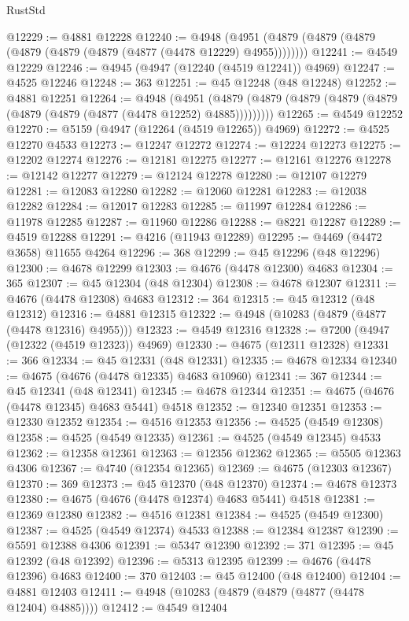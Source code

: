 \begin{lexlean}{RustStd}
\begin{coremodule}
{\begin{coremodule}
{{{{{{{{{{{{{{{{{{{{{{{{{{{{{{{{{{{{{{{{{{{{{{{{{{{{{{{{{{{{@12229 := @4881 @12228
@12240 := @4948 (@4951 (@4879 (@4879 (@4879 (@4879 (@4879 (@4879 (@4877 (@4478 @12229) @4955))))))))
@12241 := @4549 @12229
@12246 := @4945 (@4947 (@12240 (@4519 @12241)) @4969)
@12247 := @4525 @12246
@12248 := 363
@12251 := @45 @12248 (@48 @12248)
@12252 := @4881 @12251
@12264 := @4948
    (@4951 (@4879 (@4879 (@4879 (@4879 (@4879 (@4879 (@4879 (@4877 (@4478 @12252) @4885)))))))))
@12265 := @4549 @12252
@12270 := @5159 (@4947 (@12264 (@4519 @12265)) @4969)
@12272 := @4525 @12270 @4533
@12273 := @12247 @12272
@12274 := @12224 @12273
@12275 := @12202 @12274
@12276 := @12181 @12275
@12277 := @12161 @12276
@12278 := @12142 @12277
@12279 := @12124 @12278
@12280 := @12107 @12279
@12281 := @12083 @12280
@12282 := @12060 @12281
@12283 := @12038 @12282
@12284 := @12017 @12283
@12285 := @11997 @12284
@12286 := @11978 @12285
@12287 := @11960 @12286
@12288 := @8221 @12287
@12289 := @4519 @12288
@12291 := @4216 (@11943 @12289)
@12295 := @4469 (@4472 @3658) @11655 @4264
@12296 := 368
@12299 := @45 @12296 (@48 @12296)
@12300 := @4678 @12299
@12303 := @4676 (@4478 @12300) @4683
@12304 := 365
@12307 := @45 @12304 (@48 @12304)
@12308 := @4678 @12307
@12311 := @4676 (@4478 @12308) @4683
@12312 := 364
@12315 := @45 @12312 (@48 @12312)
@12316 := @4881 @12315
@12322 := @4948 (@10283 (@4879 (@4877 (@4478 @12316) @4955)))
@12323 := @4549 @12316
@12328 := @7200 (@4947 (@12322 (@4519 @12323)) @4969)
@12330 := @4675 (@12311 @12328)
@12331 := 366
@12334 := @45 @12331 (@48 @12331)
@12335 := @4678 @12334
@12340 := @4675 (@4676 (@4478 @12335) @4683 @10960)
@12341 := 367
@12344 := @45 @12341 (@48 @12341)
@12345 := @4678 @12344
@12351 := @4675 (@4676 (@4478 @12345) @4683 @5441) @4518
@12352 := @12340 @12351
@12353 := @12330 @12352
@12354 := @4516 @12353
@12356 := @4525 (@4549 @12308)
@12358 := @4525 (@4549 @12335)
@12361 := @4525 (@4549 @12345) @4533
@12362 := @12358 @12361
@12363 := @12356 @12362
@12365 := @5505 @12363 @4306
@12367 := @4740 (@12354 @12365)
@12369 := @4675 (@12303 @12367)
@12370 := 369
@12373 := @45 @12370 (@48 @12370)
@12374 := @4678 @12373
@12380 := @4675 (@4676 (@4478 @12374) @4683 @5441) @4518
@12381 := @12369 @12380
@12382 := @4516 @12381
@12384 := @4525 (@4549 @12300)
@12387 := @4525 (@4549 @12374) @4533
@12388 := @12384 @12387
@12390 := @5591 @12388 @4306
@12391 := @5347 @12390
@12392 := 371
@12395 := @45 @12392 (@48 @12392)
@12396 := @5313 @12395
@12399 := @4676 (@4478 @12396) @4683
@12400 := 370
@12403 := @45 @12400 (@48 @12400)
@12404 := @4881 @12403
@12411 := @4948 (@10283 (@4879 (@4879 (@4877 (@4478 @12404) @4885))))
@12412 := @4549 @12404
}}}}}}}}}}}}}}}}}}}}}}}}}}}}}}}}}}}}}}}}}}}}}}}}}}}}}}}}}}}}
\end{coremodule}}
\end{coremodule}
\end{lexlean}
